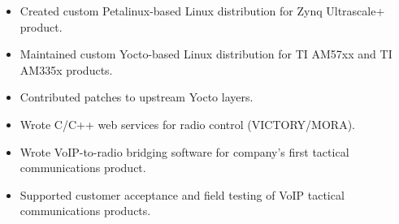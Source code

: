 \begin{itemize}
    \item Created custom Petalinux-based Linux distribution for Zynq Ultrascale+ product.
    \item Maintained custom Yocto-based Linux distribution for TI AM57xx and TI AM335x products.
    \item Contributed patches to upstream Yocto layers.
    \item Wrote C/C++ web services for radio control (VICTORY/MORA).
    \item Wrote VoIP-to-radio bridging software for company's first tactical communications product.
    \item Supported customer acceptance and field testing of VoIP tactical communications products.
\end{itemize}
